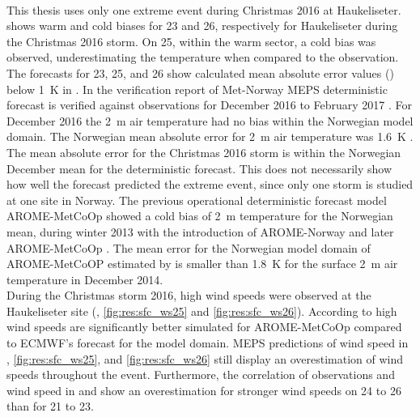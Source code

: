 \\
This thesis uses only one extreme event during Christmas 2016 at Haukeliseter. 
 shows warm and cold biases for \num{23} and \SI{26}{\dec}, respectively for Haukeliseter during the Christmas 2016 storm. On \SI{25}{\dec}, within the warm sector, a cold bias was observed, underestimating the temperature when compared to the observation. The forecasts for \num{23}, \num{25}, and \SI{26}{\dec} show calculated mean absolute error values () below \SIlist{1}{\kelvin} in . 
In the verification report of Met-Norway MEPS deterministic forecast is verified against observations for December 2016 to February 2017 \citep{homleid_verification_2016}. For December 2016 the \SI{2}{\metre} air temperature had no bias within the Norwegian model domain. The Norwegian mean absolute error for \SI{2}{\metre} air temperature was \SI{1.6}{\kelvin} \citep{homleid_verification_2016}. The mean absolute error for the Christmas 2016 storm is within the Norwegian December mean for the deterministic forecast. This does not necessarily show how well the forecast predicted the extreme event, since only one storm is studied at one site in Norway.
The previous operational deterministic forecast model AROME-MetCoOp showed a cold bias of \SI{2}{\metre} temperature for the Norwegian mean, during winter 2013 with the introduction of AROME-Norway and later AROME-MetCoOp \citep{muller_arome-metcoop:_2017}. 
The mean error for the Norwegian model domain of AROME-MetCoOP estimated by \citet{muller_arome-metcoop:_2017} is smaller than \SI{1.8}{\kelvin} for the surface \SI{2}{\metre} air temperature in December 2014. 
\\
During the Christmas storm 2016, high wind speeds were observed at the Haukeliseter site (, \ref{fig:res:sfc_ws25}  and \ref{fig:res:sfc_ws26}).
According to \citet{muller_arome-metcoop:_2017} high wind speeds are significantly better simulated for AROME-MetCoOp compared to ECMWF's forecast for the model domain. MEPS predictions of wind speed in , \ref{fig:res:sfc_ws25}, and \ref{fig:res:sfc_ws26} still display an overestimation of wind speeds throughout the event. Furthermore, the correlation of observations and wind speed in  and  show an overestimation for stronger wind speeds on \num{24} to \SI{26}{\dec} than for \num{21} to \SI{23}{\dec}. 
